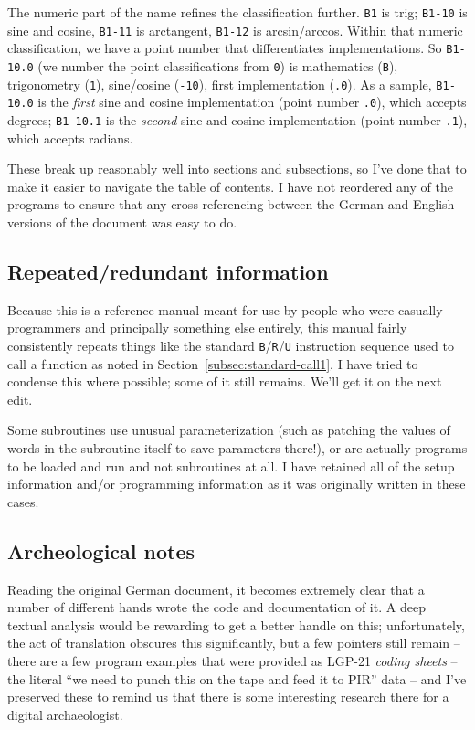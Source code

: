 The numeric part of the name refines the classification further. \texttt{B1} is trig; \texttt{B1-10} is sine and cosine, \texttt{B1-11} is arctangent, \texttt{B1-12} is arcsin/arccos. Within that numeric classification, we have a point number that differentiates implementations. So \texttt{B1-10.0} (we number the point classifications from \texttt{0}) is mathematics (\texttt{B}), trigonometry (\texttt{1}), sine/cosine (\texttt{-10}), first implementation (\texttt{.0}). As a sample,
\texttt{B1-10.0} is the \emph{first} sine and cosine implementation (point number \texttt{.0}), which accepts degrees; \texttt{B1-10.1} is the \emph{second} sine and cosine implementation (point number \texttt{.1}), which accepts radians.

These break up reasonably well into sections and subsections, so I've done that to make it easier to navigate the table of contents. I have not reordered any of the programs to ensure that any cross-referencing between the German and English versions of the document was easy to do.

\subsection{Repeated/redundant information}

Because this is a reference manual meant for use by people who were casually programmers and principally something else entirely, this manual fairly consistently repeats things like the standard \texttt{B}/\texttt{R}/\texttt{U} instruction sequence used to call a function as noted in Section~\ref{subsec:standard-call1}. I have tried to condense this where possible; some of it still remains. We'll get it on the next edit.

Some subroutines use unusual parameterization (such as patching the values of words in the subroutine itself to save parameters there!), or are actually programs to be loaded and run and not subroutines at all. I have retained all of the setup information and/or programming information as it was originally written in these cases.

\subsection{Archeological notes}

Reading the original German document, it becomes extremely clear that a number of different hands wrote the code and documentation of it. A deep textual analysis would be rewarding to get a better handle on this; unfortunately, the act of translation obscures this significantly, but a few pointers still remain -- there are a few program examples that were provided as LGP-21 \emph{coding sheets} -- the literal ``we need to punch this on the tape and feed it to PIR'' data -- and I've preserved these to remind us that there is some interesting research there for a digital archaeologist.


